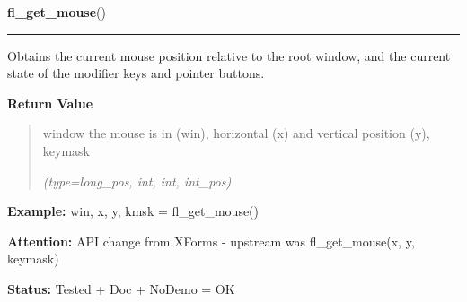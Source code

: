     \label{xformslib:flxbasic:fl_get_mouse}

    \vspace{0.5ex}

\hspace{.8\funcindent}\begin{boxedminipage}{\funcwidth}

    \raggedright \textbf{fl\_get\_mouse}()

    \vspace{-1.5ex}

    \rule{\textwidth}{0.5\fboxrule}
\setlength{\parskip}{2ex}
    Obtains the current mouse position relative to the root window, and the
    current state of the modifier keys and pointer buttons.

\setlength{\parskip}{1ex}
      \textbf{Return Value}
    \vspace{-1ex}

      \begin{quote}
      window the mouse is in (win), horizontal (x) and vertical position 
      (y), keymask

      {\it (type=long\_pos, int, int, int\_pos)}

      \end{quote}

\textbf{Example:} win, x, y, kmsk = fl\_get\_mouse()



\textbf{Attention:} API change from XForms - upstream was fl\_get\_mouse(x, y, keymask)



\textbf{Status:} Tested + Doc + NoDemo = OK



    \end{boxedminipage}

    \label{xformslib:flxbasic:fl_set_mouse}

    \vspace{0.5ex}

